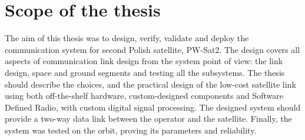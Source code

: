 \section{Scope of the thesis}
The aim of this thesis was to design, verify, validate and deploy the communication system for second Polish satellite, PW-Sat2. The design covers all aspects of communication link design from the system point of view: the link design, space and ground segments and testing all the subsystems. The thesis should describe the choices, and the practical design of the low-cost satellite link using both off-the-shelf hardware, custom-designed components and Software Defined Radio, with custom digital signal processing. The designed system should provide a two-way data link between the operator and the satellite. Finally, the system was tested on the orbit, proving its parameters and reliability.
